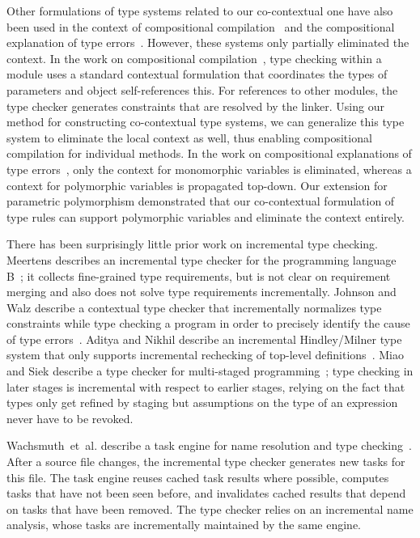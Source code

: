 \documentclass{llncs}
\begin{document}
Other formulations of type systems related to our co-contextual one have also
been used in the context of compositional compilation~\cite{AnconaDDZ05} and the
compositional explanation of type errors~\cite{Chitil01}. However, these systems
only partially eliminated the context. In the work on compositional
compilation~\cite{AnconaDDZ05}, type checking within a module uses a standard
contextual formulation that coordinates the types of parameters and object
self-references \textsf{this}. For references to other modules, the type checker
generates constraints that are resolved by the linker. Using our method for
constructing co-contextual type systems, we can generalize this type system to
eliminate the local context as well, thus enabling compositional compilation for
individual methods.
%
In the work on compositional explanations of type errors~\cite{Chitil01}, only
the context for monomorphic variables is eliminated, whereas a context for
polymorphic variables is propagated top-down. Our extension for parametric
polymorphism demonstrated that our co-contextual formulation of type rules can
support polymorphic variables and eliminate the context entirely.

There has been surprisingly little prior work on incremental type
checking. Meertens describes an incremental type checker for the programming
language B~\cite{Meertens83}; it collects fine-grained type requirements, but is not clear on
requirement merging and also does not solve type requirements
incrementally. Johnson and Walz describe a contextual type
checker that incrementally normalizes type constraints while type checking a
program in order to precisely identify the cause of type
errors~\cite{JohnsonW86}. Aditya and Nikhil describe an incremental
Hindley/Milner type system that only supports incremental rechecking of
top-level definitions~\cite{AdityaN91}. Miao and Siek describe a type checker
for multi-staged programming~\cite{MiaoS10}; type checking in later stages is incremental
with respect to earlier stages, relying on the fact that types only get refined
by staging but assumptions on the type of an expression never have to be
revoked.

Wachsmuth~et~al. describe a task engine for name resolution and type
checking~\cite{WachsmuthKVGV13}. After a source file changes,
the incremental type checker generates new tasks for this file. The task engine
reuses cached task results where possible, computes tasks that have not been
seen before, and invalidates cached results that depend on tasks that have been
removed. The type checker relies on an incremental name analysis, whose tasks
are incrementally maintained by the same engine.
\end{document}
